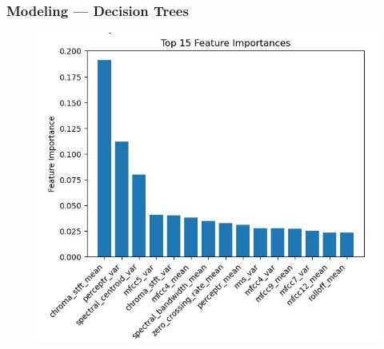 \documentclass[10pt, aspectratio=169]{beamer}
\begin{document}
\begin{frame}
    \frametitle{Modeling --- Decision Trees}
    \begin{figure}
        \centering
        \includegraphics[width=0.6\linewidth]{img/DTFeatureImportance.jpg}
    \end{figure}
\end{frame}
\end{document}

